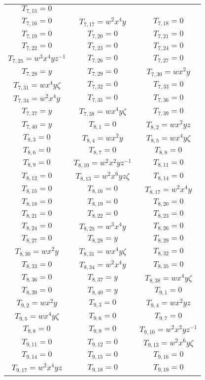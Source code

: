 \begin{longtable}{|c|c|c|}
$T_{7,15}= 0$\\
$T_{7,16}= 0$&
$T_{7,17}= w^2x^4y$&
$T_{7,18}= 0$\\
$T_{7,19}= 0$&
$T_{7,20}= 0$&
$T_{7,21}= 0$\\
$T_{7,22}= 0$&
$T_{7,23}= 0$&
$T_{7,24}= 0$\\
$T_{7,25}= w^3x^4yz^{-1}$&
$T_{7,26}= 0$&
$T_{7,27}= 0$\\
$T_{7,28}= y$&
$T_{7,29}= 0$&
$T_{7,30}= wx^2y$\\
$T_{7,31}= wx^4y\zeta$&
$T_{7,32}= 0$&
$T_{7,33}= 0$\\
$T_{7,34}= w^2x^4y$&
$T_{7,35}= 0$&
$T_{7,36}= 0$\\
$T_{7,37}= y$&
$T_{7,38}= wx^4y\zeta$&
$T_{7,39}= 0$\\
$T_{7,40}= y$&
$T_{8,1}= 0$&
$T_{8,2}= wx^2yz$\\
$T_{8,3}= 0$&
$T_{8,4}= wx^2y$&
$T_{8,5}= wx^4y\zeta$\\
$T_{8,6}= 0$&
$T_{8,7}= 0$&
$T_{8,8}= 0$\\
$T_{8,9}= 0$&
$T_{8,10}= w^2x^2yz^{-1}$&
$T_{8,11}= 0$\\
$T_{8,12}= 0$&
$T_{8,13}= w^2x^6yz\zeta$&
$T_{8,14}= 0$\\
$T_{8,15}= 0$&
$T_{8,16}= 0$&
$T_{8,17}= w^2x^4y$\\
$T_{8,18}= 0$&
$T_{8,19}= 0$&
$T_{8,20}= 0$\\
$T_{8,21}= 0$&
$T_{8,22}= 0$&
$T_{8,23}= 0$\\
$T_{8,24}= 0$&
$T_{8,25}= w^3x^4y$&
$T_{8,26}= 0$\\
$T_{8,27}= 0$&
$T_{8,28}= y$&
$T_{8,29}= 0$\\
$T_{8,30}= wx^2y$&
$T_{8,31}= wx^4y\zeta$&
$T_{8,32}= 0$\\
$T_{8,33}= 0$&
$T_{8,34}= w^2x^4y$&
$T_{8,35}= 0$\\
$T_{8,36}= 0$&
$T_{8,37}= y$&
$T_{8,38}= wx^4y\zeta$\\
$T_{8,39}= 0$&
$T_{8,40}= y$&
$T_{9,1}= 0$\\
$T_{9,2}= wx^2y$&
$T_{9,3}= 0$&
$T_{9,4}= wx^2yz$\\
$T_{9,5}= wx^4y\zeta$&
$T_{9,6}= 0$&
$T_{9,7}= 0$\\
$T_{9,8}= 0$&
$T_{9,9}= 0$&
$T_{9,10}= w^2x^2yz^{-1}$\\
$T_{9,11}= 0$&
$T_{9,12}= 0$&
$T_{9,13}= w^2x^6y\zeta$\\
$T_{9,14}= 0$&
$T_{9,15}= 0$&
$T_{9,16}= 0$\\
$T_{9,17}= w^2x^4yz$&
$T_{9,18}= 0$&
$T_{9,19}= 0$\\

\end{longtable}
